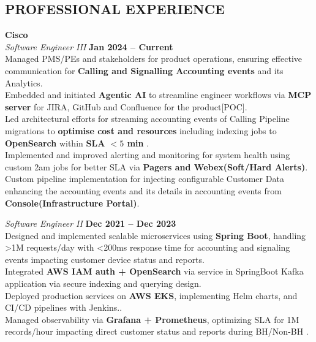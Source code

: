 \documentclass[margin,line]{resume}
\begin{document}
\begin{resume}

\vspace{-3mm}

\section{\mysidestyle \textbf{\large{P}\small{ROFESSIONAL} \large{E}\small{XPERIENCE}}}

\textbf{\listing Cisco} \vspace{2mm}\\
\textsl{Software Engineer III} \hfill \textbf{Jan 2024 -- Current}\\
Managed PMS/PEs and stakeholders for product operations, ensuring effective communication for\textbf{ Calling and Signalling Accounting events} and its Analytics.\\
Embedded and initiated {\textbf{Agentic AI}} to streamline engineer workflows via \textbf{MCP server} for JIRA, GitHub and Confluence for the product[POC].\\
Led architectural efforts for streaming accounting events of Calling Pipeline migrations to \textbf{optimise cost and resources} including indexing jobs to \textbf{OpenSearch} within \textbf{SLA $<5$ min} .\\
Implemented and improved alerting and monitoring for system health using custom 2am jobs for better SLA via\textbf{ Pagers and Webex(Soft/Hard Alerts)}.\\
Custom pipeline implementation for injecting configurable Customer Data enhancing the accounting events and its details in accounting events from \textbf{Console(Infrastructure Portal)}.\\

\vspace{1mm}

\textsl{Software Engineer II} \hfill \textbf{Dec 2021 -- Dec 2023}\\
Designed and implemented scalable microservices using \textbf{Spring Boot}, handling >1M requests/day with <200ms response time for accounting and signaling events impacting customer device status and reports.\\
Integrated \textbf{AWS IAM auth + OpenSearch} via service in SpringBoot Kafka application via secure indexing and querying design.\\
Deployed production services on \textbf{AWS EKS}, implementing  Helm charts, and CI/CD pipelines with Jenkins..\\
Managed observability via\textbf{ Grafana + Prometheus}, optimizing SLA for 1M records/hour impacting direct customer status and reports during BH/Non-BH .\\


\end{resume}
\end{document}
